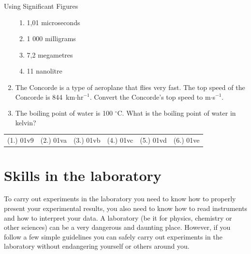 \begin{exercises}{Using Significant Figures }
\begin{enumerate}[noitemsep, label=\textbf{\arabic*}. ]
\begin{enumerate}[noitemsep, label=\textbf{\alph*}. ]
  \item 1,01 microseconds
  \item 1 000 milligrams
  \item 7,2 megametres
  \item 11 nanolitre
  \end{enumerate}
  \item The Concorde is a type of aeroplane that flies very fast. The top speed of the Concorde is 844~km$\ensuremath{\cdot}$hr${}^{-1}$. Convert the Concorde's top speed to m$\ensuremath{\cdot}$s${}^{-1}$.        
  \item The boiling point of water is 100 ${}^{\circ }$C. What is the boiling point of water in kelvin?    
\end{enumerate}
\par \practiceinfo
 \par \begin{tabular}[h]{cccccc}
  (1.) 01v9  &  (2.) 01va  &  (3.) 01vb  &  (4.) 01vc  &  (5.) 01vd  &  (6.) 01ve \end{tabular}
\end{exercises}

\section{Skills in the laboratory}
To carry out experiments in the laboratory you need to know how to properly present your experimental results, you also need to know how to read instruments and how to interpret your data. A laboratory (be it for physics, chemistry or other sciences) can be a very dangerous and daunting place. However, if you follow a few simple guidelines you can safely carry out experiments in the laboratory without endangering yourself or others around you.
